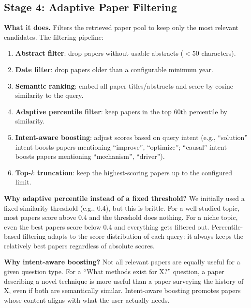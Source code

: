 \documentclass[11pt]{article}
\begin{document}
\subsection{Stage 4: Adaptive Paper Filtering}

\textbf{What it does.} Filters the retrieved paper pool to keep only the most relevant candidates. The filtering pipeline:

\begin{enumerate}[leftmargin=1.2em]
  \item \textbf{Abstract filter}: drop papers without usable abstracts ($<$50 characters).
  \item \textbf{Date filter}: drop papers older than a configurable minimum year.
  \item \textbf{Semantic ranking}: embed all paper titles/abstracts and score by cosine similarity to the query.
  \item \textbf{Adaptive percentile filter}: keep papers in the top 60th percentile by similarity.
  \item \textbf{Intent-aware boosting}: adjust scores based on query intent (e.g., ``solution'' intent boosts papers mentioning ``improve'', ``optimize''; ``causal'' intent boosts papers mentioning ``mechanism'', ``driver'').
  \item \textbf{Top-$k$ truncation}: keep the highest-scoring papers up to the configured limit.
\end{enumerate}

\textbf{Why adaptive percentile instead of a fixed threshold?} We initially used a fixed similarity threshold (e.g., 0.4), but this is brittle. For a well-studied topic, most papers score above 0.4 and the threshold does nothing. For a niche topic, even the best papers score below 0.4 and everything gets filtered out. Percentile-based filtering adapts to the score distribution of each query: it always keeps the relatively best papers regardless of absolute scores.

\textbf{Why intent-aware boosting?} Not all relevant papers are equally useful for a given question type. For a ``What methods exist for X?'' question, a paper describing a novel technique is more useful than a paper surveying the history of X, even if both are semantically similar. Intent-aware boosting promotes papers whose content aligns with what the user actually needs.

\end{document}
